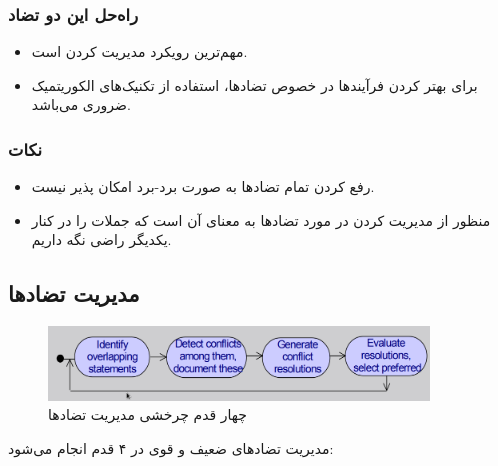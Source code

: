 \subsubsection*{راه‌حل این دو تضاد}

\begin{itemize}
    \item مهم‌ترین رویکرد مدیریت کردن است.
    \item برای بهتر کردن فرآیند‌ها در خصوص تضادها، استفاده از تکنیک‌های
    الکوریتمیک ضروری می‌باشد.
\end{itemize}

\subsubsection*{نکات}

\begin{itemize}
    \item رفع کردن تمام تضاد‌ها به صورت برد-برد امکان پذیر نیست.
    \item منظور از مدیریت کردن در مورد تضاد‌ها به معنای آن است که جملات را در
    کنار یکدیگر راضی نگه داریم.
\end{itemize}

\newpage

\subsection{مدیریت تضاد‌ها }

\begin{figure}[H]
    \centering
    \includegraphics[width=0.9\textwidth]{images/managing_conflicts.png}
    \caption{چهار قدم چرخشی مدیریت تضاد‌ها}
\end{figure}

مدیریت تضاد‌های ضعیف و قوی در ۴ قدم انجام می‌شود:

